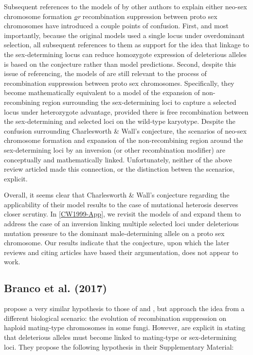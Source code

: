 \documentclass{article}
\begin{document}
\begin{appendices}
\noindent Subsequent references to the models of \citet{CharlesworthWall1999} by other authors to explain either neo-sex chromosome formation {\itshape \underline or} recombination suppression between proto sex chromosomes have introduced a couple points of confusion. First, and most importantly, because the original models used a single locus under overdominant selection, all subsequent references to them as support for the idea that linkage to the sex-determining locus can reduce homozygote expression of deleterious alleles is based on the conjecture rather than model predictions. Second, despite this issue of referencing, the models of \citet{CharlesworthWall1999} are still relevant to the process of recombination suppression between proto sex chromosomes. Specifically, they become mathematically equivalent to a model of the expansion of non-recombining region surrounding the sex-determining loci to capture a selected locus under heterozygote advantage, provided there is free recombination between the sex-determining and selected loci on the wild-type karyotype. Despite the confusion surrounding Charlesworth \& Wall's conjecture, the scenarios of neo-sex chromosome formation and expansion of the non-recombining region around the sex-determining loci by an inversion (or other recombination modifier) are conceptually and mathematically linked. Unfortunately, neither of the above review articled made this connection, or the distinction betwen the scenarios, explicit. 

Overall, it seems clear that Charlesworth \& Wall's conjecture regarding the applicability of their model results to the case of mutational heterosis deserves closer scrutiny. In \ref{CW1999-App}, we revisit the models of \citet{CharlesworthWall1999} and expand them to address the case of an inversion linking multiple selected loci under deleterious mutation pressure to the dominant male-determining allele on a proto sex chromosome. Our results indicate that the conjecture, upon which the later reviews and citing articles have based their argumentation, does not appear to work.


\subsection*{Branco et al. (2017)}

\citet{Branco2017} propose a very similar hypothesis to those of \citet{Ironside2010} and \citet{Ponnikas2018}, but approach the idea from a different biological scenario: the evolution of recombination suppression on haploid mating-type chromosomes in some fungi. However, \citet{Branco2017} are explicit in stating that deleterious alleles must become linked to mating-type or sex-determining loci. They propose the following hypothesis in their Supplementary Material:


\end{appendices}
\end{document}
